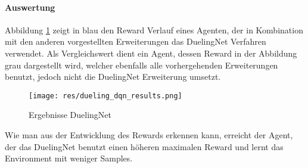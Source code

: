 \documentclass[11pt]{scrartcl}
\begin{document}
\paragraph*{Auswertung}
\noindent
\newline
Abbildung \ref{fig:dueling_dqn_results} zeigt in blau den Reward Verlauf eines Agenten,
der in Kombination mit den anderen vorgestellten Erweiterungen das DuelingNet Verfahren
verwendet. Als Vergleichswert dient ein Agent, dessen Reward in der Abbildung grau
dargestellt wird, welcher ebenfalls alle vorhergehenden Erweiterungen benutzt, 
jedoch nicht die DuelingNet Erweiterung umsetzt.
\begin{figure}[htp]
  \centering
  \texttt{[image: res/dueling\_dqn\_results.png]}
  \caption{Ergebnisse DuelingNet}
  \label{fig:dueling_dqn_results}
\end{figure}
\noindent
Wie man aus der Entwicklung des Rewards erkennen kann, erreicht der Agent, der das
DuelingNet benutzt einen höheren maximalen Reward und lernt das Environment mit weniger
Samples. %
\end{document}
